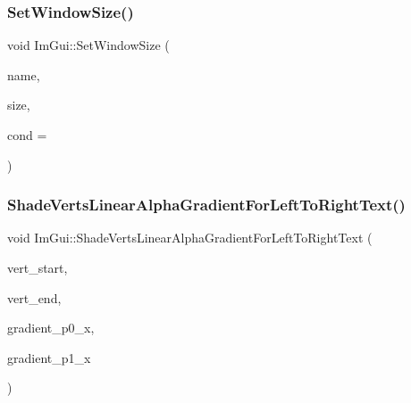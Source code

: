 \hypertarget{namespace_im_gui_a441528b9198d4531e79337121212cd33}{}\label{namespace_im_gui_a441528b9198d4531e79337121212cd33} 
\subsubsection{\texorpdfstring{Set\+Window\+Size()}{SetWindowSize()}\hspace{0.1cm}{\footnotesize\ttfamily [2/2]}}
{\footnotesize\ttfamily void Im\+Gui\+::\+Set\+Window\+Size (\begin{DoxyParamCaption}\item[{const char $\ast$}]{name,  }\item[{const \hyperlink{struct_im_vec2}{Im\+Vec2} \&}]{size,  }\item[{Im\+Gui\+Cond}]{cond = {} }\end{DoxyParamCaption})}

\hypertarget{namespace_im_gui_a73b4d230c8fffd2a07d799cd9d4e2a03}{}\label{namespace_im_gui_a73b4d230c8fffd2a07d799cd9d4e2a03} 
\subsubsection{\texorpdfstring{Shade\+Verts\+Linear\+Alpha\+Gradient\+For\+Left\+To\+Right\+Text()}{ShadeVertsLinearAlphaGradientForLeftToRightText()}}
{\footnotesize\ttfamily void Im\+Gui\+::\+Shade\+Verts\+Linear\+Alpha\+Gradient\+For\+Left\+To\+Right\+Text (\begin{DoxyParamCaption}\item[{\hyperlink{struct_im_draw_vert}{Im\+Draw\+Vert} $\ast$}]{vert\+\_\+start,  }\item[{\hyperlink{struct_im_draw_vert}{Im\+Draw\+Vert} $\ast$}]{vert\+\_\+end,  }\item[{float}]{gradient\+\_\+p0\+\_\+x,  }\item[{float}]{gradient\+\_\+p1\+\_\+x }\end{DoxyParamCaption})}

\hypertarget{namespace_im_gui_a7880876c5072e610be8f8e898d2a8866}{}\label{namespace_im_gui_a7880876c5072e610be8f8e898d2a8866} 
